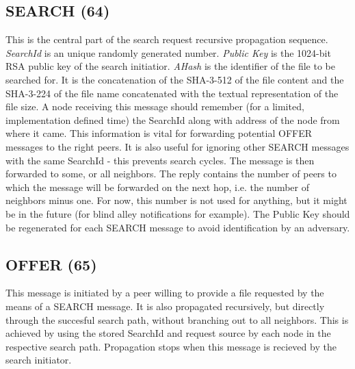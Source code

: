 \subsection{SEARCH (64)}

This is the central part of the search request recursive propagation sequence.
\textit{SearchId} is an unique randomly generated number. \textit{Public Key} 
is the 1024-bit RSA public key of the search initiatior. \textit{AHash} is the 
identifier of the file to be searched for. It is the concatenation of the 
SHA-3-512 of the file content and the SHA-3-224 of the file name concatenated 
with the textual representation of the file size. A node receiving this message 
should remember (for a limited, implementation defined time) the SearchId along 
with address of the node from where it came. This information is vital for 
forwarding potential OFFER messages to the right peers. It is also useful for 
ignoring other SEARCH messages with the same SearchId - this prevents search 
cycles. The message is then forwarded to some, or all neighbors. The reply
contains the number of peers to which the message will be forwarded on the next
hop, i.e. the number of neighbors minus one. For now, this number is not used
for anything, but it might be in the future (for blind alley notifications for
example). The Public Key should be regenerated for each SEARCH message to avoid
identification by an adversary.

\begin{figure}[H]
    \centering
\end{figure}

\subsection{OFFER (65)}

This message is initiated by a peer willing to provide a file requested by the 
means of a SEARCH message. It is also propagated recursively, but directly 
through the succesful search path, without branching out to all neighbors. This 
is achieved by using the stored SearchId and request source by each node in the 
respective search path. Propagation stops when this message is recieved by the
search initiator.

